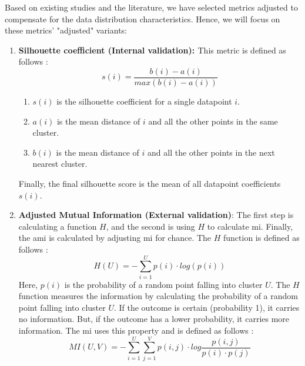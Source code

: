 Based on existing studies and the literature, we have selected metrics adjusted to compensate for the data distribution characteristics.
Hence, we will focus on these metrics' "adjusted" variants:
\begin{enumerate}
  \item \textbf{Silhouette coefficient (Internal validation): \label{eq:silhouette_coefficient}}
        This metric is defined as follows \citep{liu_understanding_2010,rousseeuw_silhouettes_1987}:
        \begin{equation}
          s(i) = \frac{b(i) - a(i)}{max(b(i) - a(i))}
        \end{equation}
        \begin{enumerate}
          \item $s(i)$ is the silhouette coefficient for a single datapoint $i$.
          \item $a(i)$ is the mean distance of $i$ and all the other points in the same cluster.
          \item $b(i)$ is the mean distance of $i$ and all the other points in the next nearest cluster.
        \end{enumerate}
        Finally, the final silhouette score is the mean of all datapoint coefficients $s(i)$.
  \item \textbf{Adjusted Mutual Information (External validation)}:
        The first step is calculating a function $H$, and the second is using $H$ to calculate \gls{mi}.
        Finally, the \gls{ami} is calculated by adjusting \gls{mi} for chance. \newline
        The $H$ function is defined as follows \citep{vinh_information_nodate}:
        \begin{equation}
          H(U) = - \sum_{i=1}^{U} p(i) \cdot log (p(i))
        \end{equation}
        Here, $p(i)$ is the probability of a random point falling into cluster $U$.
        The $H$ function measures the information by calculating the probability of a random point falling into cluster $U$.
        If the outcome is certain (probability 1), it carries no information.
        But, if the outcome has a lower probability, it carries more information.
        The \gls{mi} uses this property and is defined as follows \citep{vinh_information_nodate}:
        \begin{equation}
          MI(U, V) = - \sum_{i=1}^{U} \sum_{j=1}^{V} p(i,j) \cdot log \frac{p(i,j)}{p(i) \cdot p(j)}

\end{equation}
\end{enumerate}

